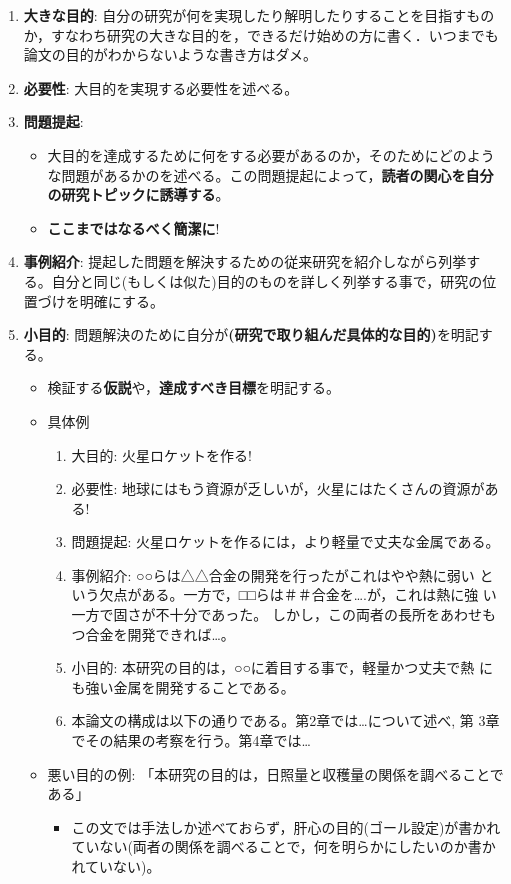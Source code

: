 \documentclass[12pt, ]{jsarticle}
\providecommand{\tightlist}{%
   \setlength{\itemsep}{0pt}\setlength{\parskip}{0pt}}
\begin{document}
\begin{enumerate}
\tightlist
\item
  \textbf{大きな目的}:
  自分の研究が何を実現したり解明したりすることを目指すものか，すなわち研究の大きな目的を，できるだけ始めの方に書く．いつまでも論文の目的がわからないような書き方はダメ。
\item
  \textbf{必要性}: 大目的を実現する必要性を述べる。
\item
  \textbf{問題提起}:

  \begin{itemize}
  \tightlist
  \item
    大目的を達成するために何をする必要があるのか，そのためにどのような問題があるかのを述べる。この問題提起によって，\textbf{読者の関心を自分の研究トピックに誘導する}。
  \item
    \textbf{ここまではなるべく簡潔に}!
  \end{itemize}
\item
  \textbf{事例紹介}:
  提起した問題を解決するための従来研究を紹介しながら列挙する。自分と同じ(もしくは似た)目的のものを詳しく列挙する事で，研究の位置づけを明確にする。
\item
  \textbf{小目的}:
  問題解決のために自分が\textbf{(研究で取り組んだ具体的な目的)}を明記する。

  \begin{itemize}
  \tightlist
  \item
    検証する\textbf{仮説}や，\textbf{達成すべき目標}を明記する。
  \item
    具体例

    \begin{enumerate}
    \tightlist
    \item
      大目的: 火星ロケットを作る!
    \item
      必要性: 地球にはもう資源が乏しいが，火星にはたくさんの資源がある!
    \item
      問題提起: 火星ロケットを作るには，より軽量で丈夫な金属である。
    \item
      事例紹介: ○○らは△△合金の開発を行ったがこれはやや熱に弱い
      という欠点がある。一方で，□□らは＃＃合金を\ldots{}.が，これは熱に強
      い一方で固さが不十分であった。
      しかし，この両者の長所をあわせもつ合金を開発できれば\ldots{}。
    \item
      小目的: 本研究の目的は，○○に着目する事で，軽量かつ丈夫で熱
      にも強い金属を開発することである。
    \item
      本論文の構成は以下の通りである。第2章では\ldots{}について述べ, 第
      3章でその結果の考察を行う。第4章では\ldots{}
    \end{enumerate}
  \item
    悪い目的の例:
    「本研究の目的は，日照量と収穫量の関係を調べることである」

    \begin{itemize}
    \tightlist
    \item
      この文では手法しか述べておらず，肝心の目的(ゴール設定)が書かれていない(両者の関係を調べることで，何を明らかにしたいのか書かれていない)。
    \end{itemize}
  \end{itemize}
\end{enumerate}
\end{document}
